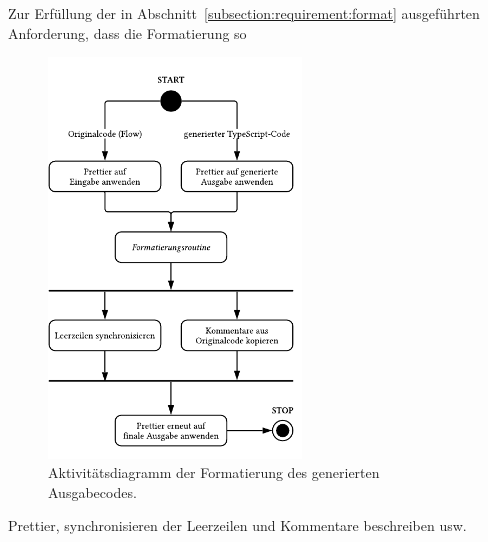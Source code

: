 Zur Erfüllung der in Abschnitt~\ref{subsection:requirement:format} ausgeführten Anforderung, dass die Formatierung so

\begin{figure}[htbp]
  \centering
  \includegraphics[width=0.6\textwidth]{src/4_Umsetzung/img/activity-diagram-formatting.pdf}
  \captionsetup{justification=centering}
	\caption[Aktivitätsdiagramm der Formatierung des Ausgabecodes]{Aktivitätsdiagramm der Formatierung des generierten Ausgabecodes.}
	\label{fig:activity-diagram-formatting}
\end{figure}

Prettier, synchronisieren der Leerzeilen und Kommentare beschreiben usw.
